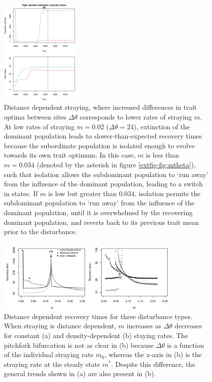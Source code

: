 \documentclass{revtex4}
\begin{document}
\begin{figure}
  \captionsetup{justification=raggedright,
singlelinecheck=false
}
\centering
\includegraphics[width=0.35\textwidth]{fig_relax_inertia.pdf}
\caption{
Distance dependent straying, where increased differences in trait optima between sites $\Delta\theta$ corresponds to lower rates of straying $m$.
At low rates of straying $m=0.02$ ($\Delta\theta=24$), extinction of the dominant population leads to slower-than-expected recovery times because the subordinate population is isolated enough to evolve towards its own trait optimum. %
In this case, $m$ is less than $m=0.034$ (denoted by the asterisk in figure \ref{extfig-fig:mtheta}), such that isolation allows the subdominant population to `run away' from the influence of the dominant population, leading to a switch in states.
If $m$ is low but greater than $0.034$, isolation permits the subdominant population to `run away' from the influence of the dominant population, until it is overwhelmed by the recovering dominant population, and reverts back to its previous trait mean prior to the disturbance.
} \label{fig:inertia}
\end{figure}

\begin{figure}
  \captionsetup{justification=raggedright,
singlelinecheck=false
}
  \centering
  \includegraphics[width=0.8\textwidth]{fig_relax_mtheta.pdf}
  \caption{
  Distance dependent recovery times for three disturbance types. When straying is distance dependent, $m$ increases as $\Delta\theta$ decreases for constant (a) and density-dependent (b) staying rates.
  The pitchfork bifurcation is not as clear in (b) because $\Delta\theta$ is a function of the individual straying rate $m_0$, whereas the x-axis in (b) is the straying rate at the steady state $m^*$.
  Despite this difference, the general trends shown in (a) are also present in (b).
  } \label{fig:mthetamvm}
\end{figure}
\end{document}
